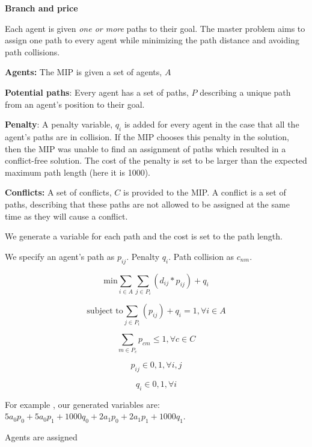 \documentclass[a4paper,11pt]{article}
\begin{document}
\textbf{Branch and price}

Each agent is given \textit{one or more} paths to their goal. The master problem aims to assign one path to every agent while minimizing the path distance and avoiding path collisions. 

\begin{compactitem}
	\item \textbf{Agents:} The MIP is given a set of agents, $A$
	\item \textbf{Potential paths}: Every agent has a set of paths, $P$ describing a unique path from an agent's position to their goal.
	\item \textbf{Penalty}: A penalty variable, $q_i$ is added for every agent in the case that all the agent's paths are in collision. If the MIP chooses this penalty in the solution, then the MIP was unable to find an assignment of paths which resulted in a conflict-free solution. The cost of the penalty is set to be larger than the expected maximum path length (here it is 1000).
	\item \textbf{Conflicts:} A set of conflicts, $C$ is provided to the MIP. A conflict is a set of paths, describing that these paths are not allowed to be assigned at the same time as they will cause a conflict. 
\end{compactitem}

We generate a variable for each path and the cost is set to the path length.

We specify an agent's path as $p_{ij}$. Penalty $q_i$. Path collision as $c_{nm}$.



\begin{equation} \label{mas:min}
\text{min} \sum_{i \in A} \sum_{j \in P_i} (d_{ij} * p_{ij}) + q_i
\end{equation}

\begin{equation} \label{mas:pick} %
\text{subject to} \sum_{j \in P_i} (p_{ij}) + q_i = 1, \forall i \in A
\end{equation}

\begin{equation} \label{mas:conflict} %
\sum_{m \in P_c} p_{cm} \le 1, \forall c \in C
\end{equation}

\begin{equation} \label{mas:path-one-or-zero} %
p_{ij} \in {0, 1}, \forall i, j
\end{equation}

\begin{equation} \label{mas:penalty} %
q_{i} \in {0, 1}, \forall i
\end{equation}

For example \cite{put example!}, our generated variables are: $5a_0p_0 + 5a_0p_1 + 1000q_0 + 2a_1p_0 + 2a_1p_1 + 1000q_1$.

Agents are assigned





	
\end{document}
